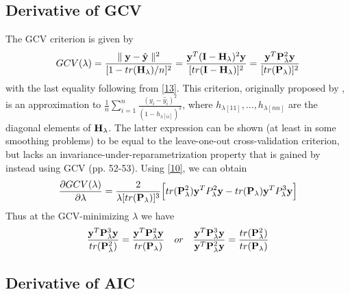 \documentclass[11pt]{article}
\begin{document}
\subsection{\textbf{Derivative of GCV}}
The GCV criterion is given by
\begin{align*}
GCV(\lambda)=\frac{\parallel {\bf y}-\hat{{\bf y}}\parallel ^2}{[1-tr({\bf H}_\lambda)/n]^2}=\frac{{\bf y}^T ({\bf I}-{\bf H}_\lambda)^2{\bf y}}{[tr({\bf I}-{\bf H}_\lambda)]^2}=\frac{{\bf y}^T {\bf P}_\lambda^2{\bf y}}{[tr({\bf P}_\lambda)]^2}
\end{align*}
with the last equality following from \eqref{13}. This criterion, originally proposed by \citep{craven_smoothing_1979}, is an approximation to $\frac{1}{n}\sum_{i=1}^n \frac{(y_i-\hat{y}_i)^2}{(1-h_{\lambda [ii]})^2}$, where $h_{\lambda [11]},...,h_{\lambda [nn]}$ are the diagonal elements of ${\bf H}_\lambda$. The latter expression can be shown (at least in some smoothing problems) to be equal to the leave-one-out cross-validation criterion, but lacks an invariance-under-reparametrization property that is gained by instead using GCV \citep{wahba_spline_1990}(pp. 52-53). Using \eqref{10}, we can obtain
\begin{align}
\frac{\partial GCV(\lambda)}{\partial \lambda}=\frac{2}{\lambda [tr({\bf P}_\lambda)]^3}\Big[tr({\bf P}_\lambda^2){\bf y}^T P_\lambda^2{\bf y}-tr({\bf P}_\lambda){\bf y}^T P_\lambda^3{\bf y} \Big]
\end{align}
Thus at the GCV-minimizing $\lambda$ we have
\begin{align*}
\frac{{\bf y}^T {\bf P}_\lambda^3{\bf y}}{tr({\bf P}_\lambda^2)}=\frac{{\bf y}^T {\bf P}_\lambda^2{\bf y}}{tr({\bf P}_\lambda)}\quad or\quad \frac{{\bf y}^T {\bf P}_\lambda^3{\bf y}}{{\bf y}^T {\bf P}_\lambda^2{\bf y}}=\frac{tr({\bf P}_\lambda^2)}{tr({\bf P}_\lambda)}
\end{align*}

\subsection{\textbf{Derivative of AIC}}

\end{document}
